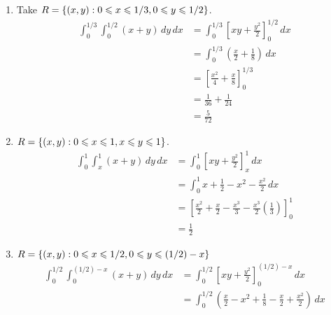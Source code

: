 \begin{Example}{}{}
\begin{enumerate}[label=(\roman*)]
\begin{enumerate}[label=(\alph*)]
                  \item Take $ R=\{(x,y):0\leqslant x\leqslant 1/3, 0\leqslant y
                                \leqslant 1/2\} $.
                        \begin{align*}
                            \int_{0}^{1/3} \int_{0}^{1/2} (x+y)\, d{y} \, d{x}
                             & =\int_{0}^{1/3}
                            \left[ xy +\frac{y^2}{2}  \right]_0^{1/2}\, d{x}                  \\
                             & =\int_{0}^{1/3} \left( \frac{x}{2} +\frac{1}{8} \right)\, d{x} \\
                             & =\left[ \frac{x^2}{4}+\frac{x}{8} \right]_0^{1/3}              \\
                             & =\frac{1}{36}+\frac{1}{24}                                     \\
                             & =\frac{5}{72}
                        \end{align*}
                  \item $ R=\{(x,y):0\leqslant x\leqslant 1,x\leqslant y\leqslant 1\} $.
                        \begin{align*}
                            \int_{0}^{1} \int_{x}^{1} (x+y)\, d{y} \, d{x}
                             & =\int_{0}^{1} \left[ xy +\frac{y^2}{2}  \right]_x^1 \, d{x} \\
                             & =\int_{0}^{1} x+\frac{1}{2}-x^2-\frac{x^2}{2}\, d{x}        \\
                             & =\left[ \frac{x^2}{2} +\frac{x}{2} -\frac{x^3}{3}-
                                \frac{x^3}{2}\left( \frac{1}{3} \right)  \right]_0^1       \\
                             & =\frac{1}{2}
                        \end{align*}
                  \item $ R=\{(x,y):0\leqslant x\leqslant
                                1/2,0\leqslant y\leqslant (1/2)-x \} $
                        \begin{align*}
                            \int_{0}^{1/2} \int_{0}^{(1/2)-x} (x+y)\, d{y} \, d{x}
                             & =\int_{0}^{1/2} \left[ xy+\frac{y^2}{2} \right]_{0}^{(1/2)-x}\, d{x}           \\
                             & =\int_{0}^{1/2} \left( \frac{x}{2} -x^2+\frac{1}{8}
                            -\frac{x}{2} +\frac{x^2}{2}   \right)\, d{x}                                      \\

\end{align*}
\end{enumerate}
\end{enumerate}
\end{Example}
